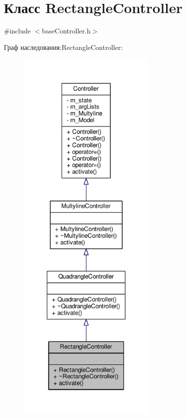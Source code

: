 \hypertarget{class_rectangle_controller}{\section{Класс Rectangle\-Controller}
\label{class_rectangle_controller}
}


{\ttfamily \#include $<$base\-Controller.\-h$>$}



Граф наследования\-:Rectangle\-Controller\-:
\nopagebreak
\begin{figure}[H]
\begin{center}
\leavevmode
\includegraphics[height=550pt]{class_rectangle_controller__inherit__graph}
\end{center}
\end{figure}


